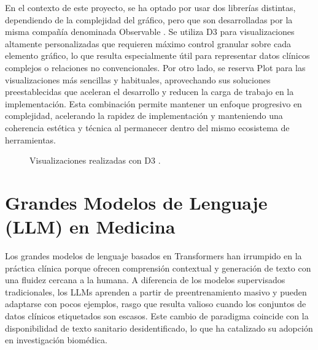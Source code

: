 \newpage
En el contexto de este proyecto, se ha optado por usar dos librerías distintas, dependiendo de la complejidad del gráfico, pero que son desarrolladas por la misma compañía denominada Observable \cite{observable}. Se utiliza D3 \cite{d3} para visualizaciones altamente personalizadas que requieren máximo control granular sobre cada elemento gráfico, lo que resulta especialmente útil para representar datos clínicos complejos o relaciones no convencionales. Por otro lado, se reserva Plot \cite{observableplot} para las visualizaciones más sencillas y habituales, aprovechando sus soluciones preestablecidas que aceleran el desarrollo y reducen la carga de trabajo en la implementación. Esta combinación permite mantener un enfoque progresivo en complejidad, acelerando la rapidez de implementación y manteniendo una coherencia estética y técnica al permanecer dentro del mismo ecosistema de herramientas.

\begin{figure}[H]
    \centering    {}
    \caption{Visualizaciones realizadas con D3 \cite{d3foto}.}
\end{figure}



\section{Grandes Modelos de Lenguaje (LLM) en Medicina}

Los grandes modelos de lenguaje basados en Transformers han irrumpido en la práctica clínica porque ofrecen comprensión contextual y generación de texto con una fluidez cercana a la humana. A diferencia de los modelos supervisados tradicionales, los LLMs aprenden a partir de preentrenamiento masivo y pueden adaptarse con pocos ejemplos, rasgo que resulta valioso cuando los conjuntos de datos clínicos etiquetados son escasos. Este cambio de paradigma coincide con la disponibilidad de texto sanitario desidentificado, lo que ha catalizado su adopción en investigación biomédica.

